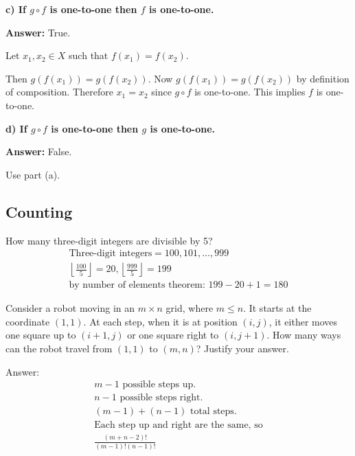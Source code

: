 \documentclass[landscape, letterpaper, 8pt]{extarticle}
\begin{document}
\begin{multicols}{3}
    \textbf{c) If $g \circ f$ is one-to-one then $f$ is one-to-one.}

    \textbf{Answer: } True.

    Let $x_1, x_2 \in X$ such that $f(x_1) = f(x_2)$.
    
    Then $g(f(x_1)) = g(f(x_2))$. Now $g(f(x_1)) = g(f(x_2))$ by definition of composition. Therefore $x_1 = x_2$ since $g \circ f$ is one-to-one. This implies $f$ is one-to-one.

    \textbf{d) If $g \circ f$ is one-to-one then $g$ is one-to-one.}

    \textbf{Answer: } False.

    Use part (a).

    \subsection*{Counting}
    \begin{example}
        How many three-digit integers are divisible by 5?
        \begin{equation*}
            \begin{aligned}
                \text{Three-digit integers} = {100, 101, \ldots, 999}                                         \\
                \left\lfloor \frac{100}{5} \right\rfloor = 20, \left\lfloor \frac{999}{5} \right\rfloor = 199 \\
                \text{by number of elements theorem: } 199-20 + 1 = 180
            \end{aligned}
        \end{equation*}
    \end{example}
    \begin{example}
        Consider a robot moving in an $m \times n$ grid, where $m\leq n$. It starts at the coordinate $(1,1)$. At each step, when it is at position $(i,j)$, it either moves one square up to $(i+1, j)$ or one square right to $(i, j+1)$. How many ways can the robot travel from $(1,1)$ to $(m,n)$? Justify your answer.

        Answer:
        \begin{align*}
            m - 1 \text{ possible steps up.}               \\
            n - 1 \text{ possible steps right.}            \\
            (m - 1) + (n - 1) \text{ total steps.}         \\
            \text{Each step up and right are the same, so} \\
            \frac{(m+n - 2)!}{(m-1)!(n-1)!}                \\
        \end{align*}
    \end{example}

\end{multicols}
\end{document}
